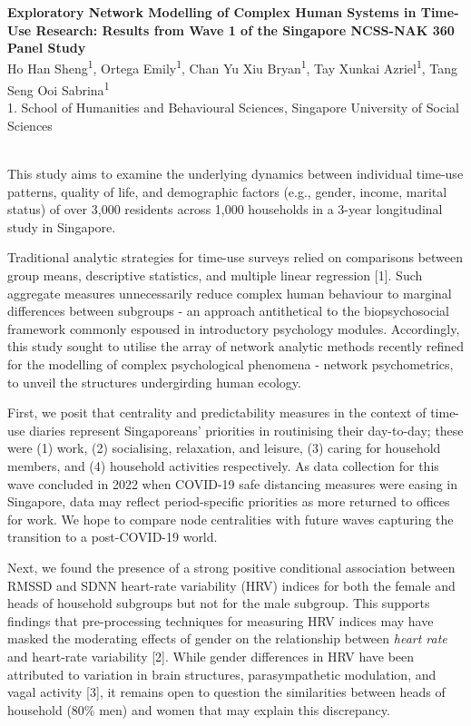 \documentclass[11pt]{article}
\renewcommand{\title}[1]{{\noindent\large\bfseries#1\medskip\\}}
\renewcommand{\author}[2]{{\noindent #1 \medskip\\ \small #2 \medskip\\}}
\begin{document}
\title{Exploratory Network Modelling of Complex Human Systems in Time-Use Research: Results from Wave 1 of the Singapore NCSS-NAK 360 Panel Study}
\author{
Ho Han Sheng\textsuperscript{1},
Ortega Emily\textsuperscript{1},
Chan Yu Xiu Bryan\textsuperscript{1},
Tay Xunkai Azriel\textsuperscript{1},
Tang Seng Ooi Sabrina\textsuperscript{1}
}
{
1. School of Humanities and Behavioural Sciences, Singapore University of Social Sciences\\
}

This study aims to examine the underlying dynamics between individual time-use patterns,  quality of life, and demographic factors (e.g., gender, income, marital status) of over 3,000 residents across 1,000 households in a 3-year longitudinal study in Singapore.

Traditional analytic strategies for time-use surveys relied on comparisons between group means, descriptive statistics, and multiple linear regression [1]. Such aggregate measures unnecessarily reduce complex human behaviour to marginal differences between subgroups - an approach antithetical to the biopsychosocial framework commonly espoused in introductory psychology modules. Accordingly, this study sought to utilise the array of network analytic methods recently refined for the modelling of complex psychological phenomena - network psychometrics, to unveil the structures undergirding human ecology. 

First, we posit that centrality and predictability measures in the context of time-use diaries represent Singaporeans' priorities in routinising their day-to-day; these were (1) work, (2) socialising, relaxation, and leisure, (3) caring for household members, and (4) household activities respectively. As data collection for this wave concluded in 2022 when COVID-19 safe distancing measures were easing in Singapore, data may reflect period-specific priorities as more returned to offices for work. We hope to compare node centralities with future waves capturing the transition to a post-COVID-19 world. 

Next, we found the presence of a strong positive conditional association between RMSSD and SDNN heart-rate variability (HRV) indices for both the female and heads of household subgroups but not for the male subgroup. This supports findings that pre-processing techniques for measuring HRV indices may have masked the moderating effects of gender on the relationship between \emph{heart rate} and heart-rate variability [2]. While gender differences in HRV have been attributed to variation in brain structures, parasympathetic modulation, and vagal activity [3], it remains open to question the similarities between heads of household (80\% men) and women that may explain this discrepancy.
\end{document}
